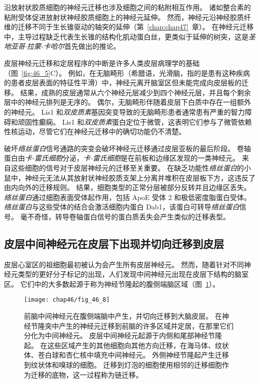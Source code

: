 沿放射状胶质细胞的神经元迁移也涉及细胞之间的粘附相互作用。
诸如整合素的粘附受体促进放射状神经胶质细胞上的神经元延伸。
然而，神经元沿神经胶质纤维的迁移不同于生长锥驱动的轴突的延伸（第~\ref{chap:chap47}~章）。
在神经元迁移中，主导过程缺乏代表生长锥的结构化肌动蛋白丝，更类似于延伸的树突，这是\textit{圣地亚哥$\cdot$拉蒙-卡哈尔}首先做出的推论。


皮层神经元迁移和定居程序的中断是许多人类皮层病理学的基础（图~\ref{fig:46_5}C）。
例如，在无脑畸形（希腊语，光滑脑，指的是患有这种疾病的患者皮层表面的特征性平滑）中，神经元离开脑室区但未能完成向皮层板的迁移。
结果，成熟的皮层通常从六个神经元层减少到四个神经元层，并且每个剩余层中的神经元排列是无序的。
偶尔，无脑畸形伴随着皮层下白质中存在一组额外的神经元。
Lis1 和\textit{双皮质素}基因突变导致的无脑畸形患者通常患有严重的智力障碍和顽固性癫痫。
Lis1 和\textit{双皮质素}蛋白定位于微管，这表明它们参与了微管依赖性核运动，尽管它们在神经元迁移中的确切功能仍不清楚。


破坏\textit{络丝蛋白}信号通路的突变会破坏神经元迁移通过皮层亚板的最后阶段。
卷轴蛋白由\textit{卡-雷氏细胞}分泌，\textit{卡-雷氏细胞}是在前板和边缘区发现的一类神经元。
来自这些细胞的信号对于皮层神经元的迁移至关重要。
在缺乏功能性\textit{络丝蛋白}的小鼠中，神经元无法从其放射状神经胶质支架上分离并堆积在皮层板下方，这违反了由内向外的迁移规则。
结果，细胞类型的正常分层被部分反转并且边缘区丢失。
\textit{络丝蛋白}通过细胞表面受体起作用，包括 ApoE 受体 2 和极低密度脂蛋白受体。
\textit{络丝蛋白}与这些受体的结合会激活细胞内蛋白 Dab1，该蛋白可转导\textit{络丝蛋白}信号。
毫不奇怪，转导卷轴蛋白信号的蛋白质丢失会产生类似的迁移表型。



\subsection{皮层中间神经元在皮层下出现并切向迁移到皮层}

皮层心室区的祖细胞最初被认为会产生所有皮层神经元。
然而，随着针对不同神经元类型的更好分子标记的出现，人们发现中间神经元出现在皮层下结构的脑室区。
它们中的大多数起源于称为神经节隆起的腹侧端脑区域（图~\ref{fig:46_8}）。


\begin{figure}[htbp]
	\centering
	\texttt{[image: chap46/fig\_46\_8]}
	\caption{前脑中间神经元在腹侧端脑中产生，并切向迁移到大脑皮层。
		在神经节隆突中产生的神经元迁移到前脑的许多区域并定居，在那里它们分化为中间神经元。
		皮层中间神经元起源于内侧和尾部神经节隆起。
		在这些区域产生的其他细胞向其他方向迁移，在海马体、纹状体、苍白球和杏仁核中填充中间神经元。
		外侧神经节隆起产生迁移到纹状体和嗅球的细胞。
		迁移到灯泡的细胞使用相邻的迁移细胞作为迁移的底物，这一过程称为链迁移\cite{bandler2017cortical}。}
	\label{fig:46_8}
\end{figure}


